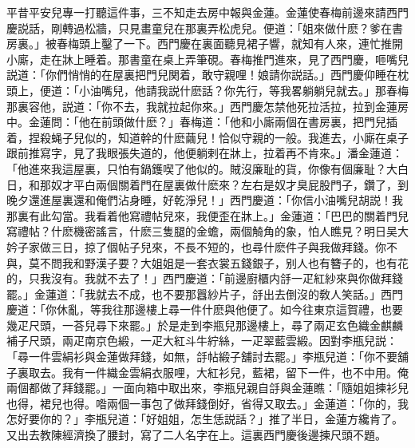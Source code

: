 平昔平安兒專一打聽這件事，三不知走去房中報與金蓮。金蓮使春梅前邊來請西門慶説話，剛轉過松牆，只見畫童兒在那裏弄松虎兒。便道：「姐來做什麽？爹在書房裏。」被春梅頭上鑿了一下。西門慶在裏面聽見裙子響，就知有人來，連忙推開小廝，走在牀上睡着。那書童在桌上弄筆硯。春梅推門進來，見了西門慶，咂嘴兒説道：「你們悄悄的在屋裏把門兒関着，敢守親哩！娘請你説話。」西門慶仰睡在枕頭上，便道：「小油嘴兒，他請我説什麽話？你先行，等我畧躺躺兒就去。」那春梅那裏容他，説道：「你不去，我就拉起你來。」西門慶怎禁他死拉活拉，拉到金蓮房中。金蓮問：「他在前頭做什麽？」春梅道：「他和小廝兩個在書房裏，把門兒插着，捏殺蝇子兒似的，知道幹的什麽繭兒！恰似守親的一般。我進去，小廝在桌子跟前推寫字，見了我眼張失道的，他便躺剌在牀上，拉着再不肯來。」潘金蓮道：「他進來我這屋裏，只怕有鍋鑊喫了他似的。賊沒廉耻的貨，你像有個廉耻？大白日，和那奴才平白兩個關着門在屋裏做什麽來？左右是奴才臭屁股門子，鑽了，到晚夕還進屋裏還和俺們沾身睡，好乾淨兒！」西門慶道：「你信小油嘴兒胡説！我那裏有此勾當。我看着他寫禮帖兒來，我便歪在牀上。」金蓮道：「巴巴的關着門兒寫禮帖？什麽機密謠言，什麽三隻腿的金蟾，兩個觭角的象，怕人瞧見？明日吴大妗子家做三日，掠了個帖子兒來，不長不短的，也尋什麽件子與我做拜錢。你不與，莫不問我和野漢子要？大姐姐是一套衣裳五錢銀子，别人也有簪子的，也有花的，只我沒有。我就不去了！」西門慶道：「前邊廚櫃内㧱一疋紅紗來與你做拜錢罷。」金蓮道：「我就去不成，也不要那囂紗片子，㧱出去倒沒的敎人笑話。」西門慶道：「你休亂，等我往那邊樓上尋一件什麽與他便了。如今往東京這賀禮，也要幾疋尺頭，一荅兒尋下來罷。」於是走到李瓶兒那邊樓上，尋了兩疋玄色織金麒麟補子尺頭，兩疋南京色緞，一疋大紅斗牛紵絲，一疋翠藍雲緞。因對李瓶兒説：「尋一件雲絹衫與金蓮做拜錢，如無，㧱帖緞子舖討去罷。」李瓶兒道：「你不要舖子裏取去。我有一件織金雲絹衣服哩，大紅衫兒，藍裙，留下一件，也不中用。俺兩個都做了拜錢罷。」一面向箱中取出來，李瓶兒親自㧱與金蓮瞧：「隨姐姐揀衫兒也得，裙兒也得。喒兩個一事包了做拜錢倒好，省得又取去。」金蓮道：「你的，我怎好要你的？」李瓶兒道：「好姐姐，怎生恁説話？」推了半日，金蓮方纔肯了。又出去教陳經濟換了腰封，寫了二人名字在上。這裏西門慶後邊揀尺頭不題。

